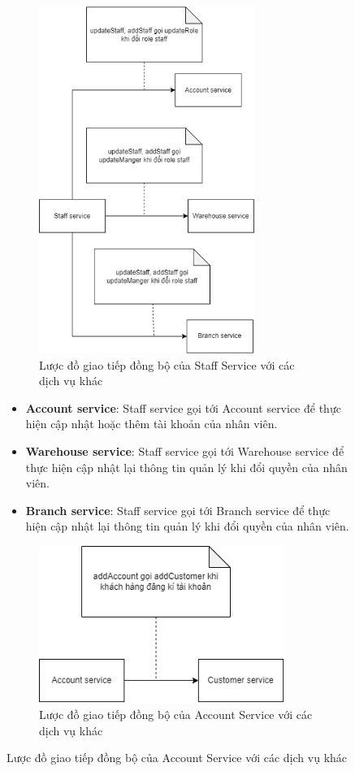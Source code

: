 \begin{figure}[!htp]
\newpage
{}
\begin{figure}[!htp]
	\centering
	\includegraphics[width=7cm]{img/Architecture/service/staff-call.png}
	\newline
	\caption{Lược đồ giao tiếp đồng bộ của Staff Service với các dịch vụ khác}
\end{figure}

\begin{itemize}
	\item \textbf{Account service}: Staff service gọi tới Account service để thực hiện cập nhật hoặc thêm tài khoản của nhân viên.
	\item \textbf{Warehouse service}: Staff service gọi tới Warehouse service để thực hiện cập nhật lại thông tin quản lý khi đổi quyền của nhân viên.
	\item \textbf{Branch service}: Staff service gọi tới Branch service để thực hiện cập nhật lại thông tin quản lý khi đổi quyền của nhân viên.
\end{itemize}

\begin{figure}[!htp]
	\centering
	\includegraphics[width=8cm]{img/Architecture/service/account-call.png}
	\newline
	\caption{Lược đồ giao tiếp đồng bộ của Account Service với các dịch vụ khác}
\end{figure}


\end{figure}
